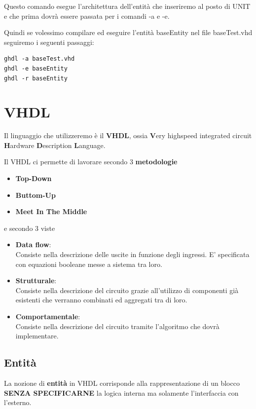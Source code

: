 \documentclass[a4paper]{book}
\begin{document}
Questo comando esegue l'architettura dell'entità che inseriremo al posto di UNIT e che prima dovrà essere passata per i comandi -a e -e.



Quindi se volessimo compilare ed eseguire l'entità baseEntity nel file baseTest.vhd seguiremo i seguenti passaggi:
\begin{verbatim}
ghdl -a baseTest.vhd
ghdl -e baseEntity
ghdl -r baseEntity
\end{verbatim}

\section{VHDL}

Il linguaggio che utilizzeremo è il \textbf{VHDL}, ossia \textbf{V}ery highspeed integrated circuit \textbf{H}ardware \textbf{D}escription \textbf{L}anguage.

Il VHDL ci permette di lavorare secondo 3 \textbf{metodologie}

\begin{itemize}
\item \textbf{Top-Down}
\item \textbf{Buttom-Up}
\item \textbf{Meet In The Middle}
\end{itemize}

e secondo 3 viste

\begin{itemize}
\item \textbf{Data flow}: \\ Consiste nella descrizione delle uscite in funzione degli ingressi. E' specificata con equazioni booleane messe a sistema tra loro.
\item \textbf{Strutturale}:\\ Consiste nella descrizione del circuito grazie all'utilizzo di componenti già esistenti che verranno combinati ed aggregati tra di loro. 
\item \textbf{Comportamentale}: \\ Consiste nella descrizione del circuito tramite l'algoritmo che dovrà implementare.
\end{itemize}


\newpage
\subsection{Entità}

La nozione di \textbf{entità} in VHDL corrisponde alla rappresentazione di un blocco \textbf{SENZA SPECIFICARNE} la logica interna ma solamente l'interfaccia con l'esterno.
\end{document}
